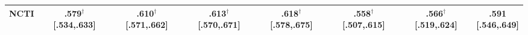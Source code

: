 \begin{center}
\begin{tabular}{@{}lccccccc@{}}
\midrule
NCTI & \shortstack{.579$^\dag$ \\ {\scriptsize [.534,.633]}} & \shortstack{.610$^\dag$ \\ {\scriptsize [.571,.662]}} & \shortstack{.613$^\dag$ \\ {\scriptsize [.570,.671]}} & \shortstack{.618$^\dag$ \\ {\scriptsize [.578,.675]}} & \shortstack{.558$^\dag$ \\ {\scriptsize [.507,.615]}} & \shortstack{.566$^\dag$ \\ {\scriptsize [.519,.624]}} & \shortstack{\textbf{.591} \\ {\scriptsize [.546,.649]}} \\
\bottomrule
\end{tabular}
\end{center}
